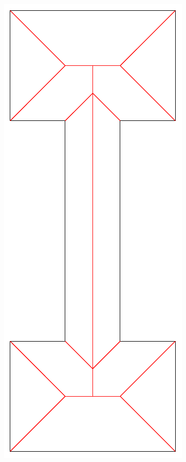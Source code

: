 \begin{figure}[htbp]
\begin{ccTexOnly}
\begin{center}
\includegraphics{fig2} %

\end{center}
\end{ccTexOnly}
\end{figure}
